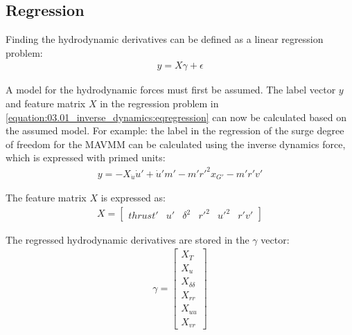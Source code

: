 \subsection{Regression}
Finding the hydrodynamic derivatives can be defined as a linear regression problem:
\begin{equation}\label{equation:03.01_inverse_dynamics:eqregression}
\begin{split}y = X\gamma + \epsilon\end{split}
\end{equation}

\noindent A model for the hydrodynamic forces must first be assumed.
The label vector \(y\) and feature matrix \(X\) in the regression problem in \autoref{equation:03.01_inverse_dynamics:eqregression} can now be calculated based on the assumed model. For example: the label in the regression of the surge degree of freedom for the MAVMM can be calculated using the inverse dynamics force, which is expressed with primed units:
\begin{equation}\label{equation:03.01_inverse_dynamics:diff_eq_X_y}
\begin{split}\displaystyle y = - X_{\dot{u}} \dot{u}' + \dot{u}' m' - m' r'^{2} x_{G'} - m' r' v'\end{split}
\end{equation}

\noindent The feature matrix \(X\) is expressed as:
\begin{equation}\label{equation:03.01_inverse_dynamics:diff_eq_X_X}
\begin{split}\displaystyle X = \left[\begin{matrix}thrust' & u' & \delta^{2} & r'^{2} & u'^{2} & r' v'\end{matrix}\right]\end{split}
\end{equation}

\noindent The regressed hydrodynamic derivatives are stored in the \(\gamma\) vector:
\begin{equation}\label{equation:03.01_inverse_dynamics:diff_eq_X_beta}
\begin{split}\displaystyle \gamma = \left[\begin{matrix}X_{T}\\X_{u}\\X_{\delta\delta}\\X_{rr}\\X_{uu}\\X_{vr}\end{matrix}\right]\end{split}
\end{equation}

